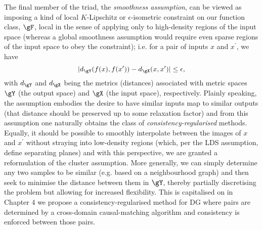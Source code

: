 %
The final member of the triad, the \emph{smoothness assumption}, can be viewed as imposing a kind
of local \(K\)-Lipschitz or \(\epsilon\)-isometric constraint on our function class, \( \gF \),
local in the sense of applying only to high-density regions of the input space (whereas a global
smoothness assumption would require even sparse regions of the input space to obey the constraint);
i.e. for a pair of inputs \( x \) and \( x^\prime \), we have
%
\begin{equation}
  | d_\gY( f(x), f(x^\prime) ) - d_\gX( x, x^\prime ) | \le \epsilon,
 \end{equation}
 with \(d_\gY \) and \( d_\gX \) being the metrics (distances) associated with metric spaces \( \gY
 \) (the output space) and \( \gX \) (the input space), respectively.
 Plainly speaking, the assumption embodies the desire to have similar inputs map to similar outputs
 (that distance should be preserved up to some relaxation factor) and from this assumption one
 naturally obtains the class of \emph{consistency-regularised} methods. 
 Equally, it should be possible to smoothly interpolate between the images of \(x\) and \( x^\prime
 \) without straying into low-density regions (which, per the LDS assumption, define separating
 planes) and with this perspective, we are granted a reformulation of the cluster assumption.
 More generally, we can simply determine any two samples to be similar (e.g. based on a
 neighbourhood graph) and then seek to minimise the distance between them in \( \gY \), thereby
 partially discretising the problem but allowing for increased flexibility.
 This is capitalised on in Chapter 4 we propose a consistency-regularised method for DG where pairs
 are determined by a cross-domain causal-matching algorithm and consistency is enforced between
 those pairs.
